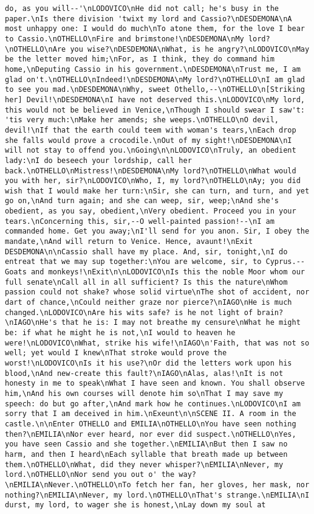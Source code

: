 \begin{verbatim}
do, as you will--'\nLODOVICO\nHe did not call; he's busy in the paper.\nIs there division 'twixt my lord and Cassio?\nDESDEMONA\nA most unhappy one: I would do much\nTo atone them, for the love I bear to Cassio.\nOTHELLO\nFire and brimstone!\nDESDEMONA\nMy lord?\nOTHELLO\nAre you wise?\nDESDEMONA\nWhat, is he angry?\nLODOVICO\nMay be the letter moved him;\nFor, as I think, they do command him home,\nDeputing Cassio in his government.\nDESDEMONA\nTrust me, I am glad on't.\nOTHELLO\nIndeed!\nDESDEMONA\nMy lord?\nOTHELLO\nI am glad to see you mad.\nDESDEMONA\nWhy, sweet Othello,--\nOTHELLO\n[Striking her] Devil!\nDESDEMONA\nI have not deserved this.\nLODOVICO\nMy lord, this would not be believed in Venice,\nThough I should swear I saw't: 'tis very much:\nMake her amends; she weeps.\nOTHELLO\nO devil, devil!\nIf that the earth could teem with woman's tears,\nEach drop she falls would prove a crocodile.\nOut of my sight!\nDESDEMONA\nI will not stay to offend you.\nGoing\n\nLODOVICO\nTruly, an obedient lady:\nI do beseech your lordship, call her back.\nOTHELLO\nMistress!\nDESDEMONA\nMy lord?\nOTHELLO\nWhat would you with her, sir?\nLODOVICO\nWho, I, my lord?\nOTHELLO\nAy; you did wish that I would make her turn:\nSir, she can turn, and turn, and yet go on,\nAnd turn again; and she can weep, sir, weep;\nAnd she's obedient, as you say, obedient,\nVery obedient. Proceed you in your tears.\nConcerning this, sir,--O well-painted passion!--\nI am commanded home. Get you away;\nI'll send for you anon. Sir, I obey the mandate,\nAnd will return to Venice. Hence, avaunt!\nExit DESDEMONA\n\nCassio shall have my place. And, sir, tonight,\nI do entreat that we may sup together:\nYou are welcome, sir, to Cyprus.--Goats and monkeys!\nExit\n\nLODOVICO\nIs this the noble Moor whom our full senate\nCall all in all sufficient? Is this the nature\nWhom passion could not shake? whose solid virtue\nThe shot of accident, nor dart of chance,\nCould neither graze nor pierce?\nIAGO\nHe is much changed.\nLODOVICO\nAre his wits safe? is he not light of brain?\nIAGO\nHe's that he is: I may not breathe my censure\nWhat he might be: if what he might he is not,\nI would to heaven he were!\nLODOVICO\nWhat, strike his wife!\nIAGO\n'Faith, that was not so well; yet would I knew\nThat stroke would prove the worst!\nLODOVICO\nIs it his use?\nOr did the letters work upon his blood,\nAnd new-create this fault?\nIAGO\nAlas, alas!\nIt is not honesty in me to speak\nWhat I have seen and known. You shall observe him,\nAnd his own courses will denote him so\nThat I may save my speech: do but go after,\nAnd mark how he continues.\nLODOVICO\nI am sorry that I am deceived in him.\nExeunt\n\nSCENE II. A room in the castle.\n\nEnter OTHELLO and EMILIA\nOTHELLO\nYou have seen nothing then?\nEMILIA\nNor ever heard, nor ever did suspect.\nOTHELLO\nYes, you have seen Cassio and she together.\nEMILIA\nBut then I saw no harm, and then I heard\nEach syllable that breath made up between them.\nOTHELLO\nWhat, did they never whisper?\nEMILIA\nNever, my lord.\nOTHELLO\nNor send you out o' the way?\nEMILIA\nNever.\nOTHELLO\nTo fetch her fan, her gloves, her mask, nor nothing?\nEMILIA\nNever, my lord.\nOTHELLO\nThat's strange.\nEMILIA\nI durst, my lord, to wager she is honest,\nLay down my soul at 
\end{verbatim}
